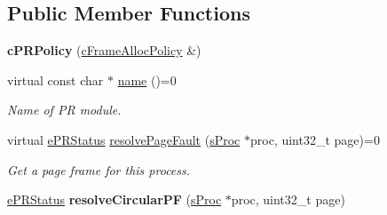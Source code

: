 \subsection*{\-Public \-Member \-Functions}
\begin{DoxyCompactItemize}
\item 
\hypertarget{classcPRPolicy_ad100e742a4a0442512c1196d657e4b28}{{\bfseries c\-P\-R\-Policy} (\hyperlink{classcFrameAllocPolicy}{c\-Frame\-Alloc\-Policy} \&)}\label{d7/df0/classcPRPolicy_ad100e742a4a0442512c1196d657e4b28}

\item 
virtual const char $\ast$ \hyperlink{classcPRPolicy_ad0de8c0c77f8d2ecb1f5679f0c25b5be}{name} ()=0
\begin{DoxyCompactList}\small\item\em \-Name of \-P\-R module. \end{DoxyCompactList}\item 
virtual \hyperlink{pageReplace_8h_af4bc4c41a44c2bd80e8cbf1aae370217}{e\-P\-R\-Status} \hyperlink{classcPRPolicy_aae8a15e6e99ec90d54210fc4d4ddf211}{resolve\-Page\-Fault} (\hyperlink{structsProc}{s\-Proc} $\ast$proc, uint32\-\_\-t page)=0
\begin{DoxyCompactList}\small\item\em \-Get a page frame for this process. \end{DoxyCompactList}\item 
\hypertarget{classcPRPolicy_a21eaa5302ec87c7643eb2c0d0f65f5cf}{\hyperlink{pageReplace_8h_af4bc4c41a44c2bd80e8cbf1aae370217}{e\-P\-R\-Status} {\bfseries resolve\-Circular\-P\-F} (\hyperlink{structsProc}{s\-Proc} $\ast$proc, uint32\-\_\-t page)}\label{d7/df0/classcPRPolicy_a21eaa5302ec87c7643eb2c0d0f65f5cf}


\end{DoxyCompactItemize}
